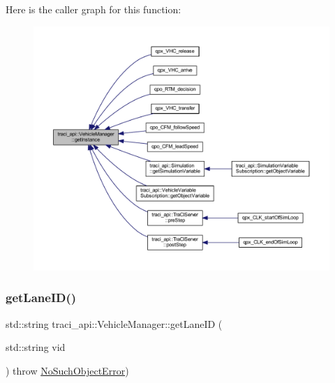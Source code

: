 Here is the caller graph for this function\+:
\nopagebreak
\begin{figure}[H]
\begin{center}
\leavevmode
\includegraphics[width=350pt]{classtraci__api_1_1_vehicle_manager_a2f2e2b5647eda9af94094da62788cd2e_icgraph}
\end{center}
\end{figure}
\mbox{\label{classtraci__api_1_1_vehicle_manager_a5cf2db6460fa94ccb2b3d489369b7d0e}} 
\subsubsection{\texorpdfstring{get\+Lane\+I\+D()}{getLaneID()}}
{\footnotesize\ttfamily std\+::string traci\+\_\+api\+::\+Vehicle\+Manager\+::get\+Lane\+ID (\begin{DoxyParamCaption}\item[{std\+::string}]{vid }\end{DoxyParamCaption}) throw  \hyperlink{classtraci__api_1_1_no_such_object_error}{No\+Such\+Object\+Error}) }

